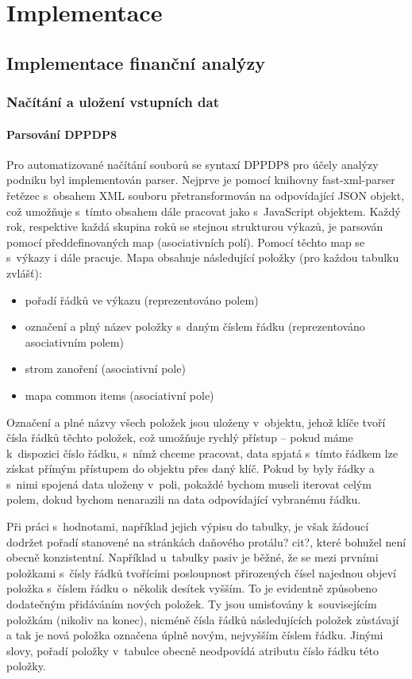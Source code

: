 \chapter{Implementace}


\section{Implementace finanční analýzy}

\subsection{Načítání a uložení vstupních dat}

\subsubsection{Parsování DPPDP8}
Pro automatizované načítání souborů se syntaxí DPPDP8 pro účely analýzy podniku byl implementován parser. Nejprve je pomocí knihovny fast-xml-parser řetězec s~obsahem XML souboru přetransformován na odpovídající JSON objekt, což umožňuje s~tímto obsahem dále pracovat jako s~JavaScript objektem. Každý rok, respektive každá skupina roků se stejnou strukturou výkazů, je parsován pomocí předdefinovaných map (asociativních polí). Pomocí těchto map se s~výkazy i dále pracuje. Mapa obsahuje následující položky (pro každou tabulku zvlášť):

\begin{itemize}
\item pořadí řádků ve výkazu (reprezentováno polem)
\item označení a plný název položky s~daným číslem řádku (reprezentováno asociativním polem)
\item strom zanoření (asociativní pole)
\item mapa common items (asociativní pole)
\end{itemize} 

Označení a plné názvy všech položek jsou uloženy v~objektu, jehož klíče tvoří čísla řádků těchto položek, což umožňuje rychlý přístup -- pokud máme k~dispozici číslo řádku, s~nímž chceme pracovat, data spjatá s~tímto řádkem lze získat přímým přístupem do objektu přes daný klíč. Pokud by byly řádky a s~nimi spojená data uloženy v~poli, pokaždé bychom museli iterovat celým polem, dokud bychom nenarazili na data odpovídající vybranému řádku.

Při práci s~hodnotami, například jejich výpisu do tabulky, je však žádoucí dodržet pořadí stanovené na stránkách daňového protálu? cit?, které bohužel není obecně konzistentní. Například u~tabulky pasiv je běžné, že se mezi prvními položkami s~čísly řádků tvořícími posloupnost přirozených čísel najednou objeví položka s~číslem řádku o~několik desítek vyšším. To je evidentně způsobeno dodatečným přidáváním nových položek. Ty jsou umisťovány k~souvisejícím položkám (nikoliv na konec), nicméně čísla řádků následujících položek zůstávají a tak je nová položka označena úplně novým, nejvyšším číslem řádku. Jinými slovy, pořadí položky v~tabulce obecně neodpovídá atributu číslo řádku této položky. 

